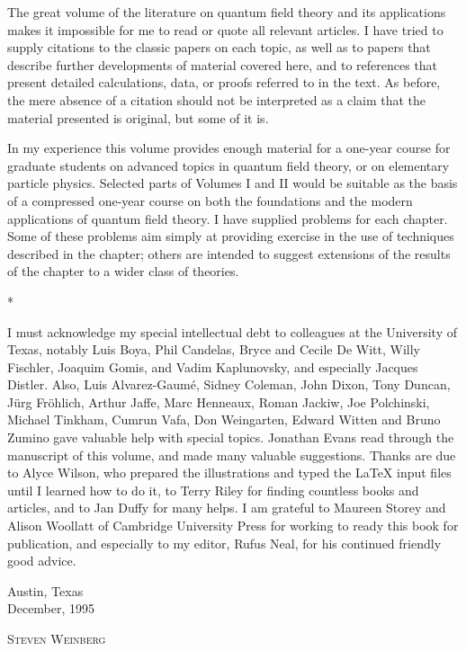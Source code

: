 The great volume of the literature on quantum field theory and its applications
makes it impossible for me to read or quote all relevant articles. I have tried
to supply citations to the classic papers on each topic, as well as to papers
that describe further developments of material covered here, and to references
that present detailed calculations, data, or proofs referred to in the text. As
before, the mere absence of a citation should not be interpreted as a claim that
the material presented is original, but some of it is.

In my experience this volume provides enough material for a one-year course for
graduate students on advanced topics in quantum field theory, or on elementary
particle physics. Selected parts of Volumes I and II would be suitable as the
basis of a compressed one-year course on both the foundations and the modern
applications of quantum field theory. I have supplied problems for each
chapter. Some of these problems aim simply at providing exercise in the use of
techniques described in the chapter; others are intended to suggest extensions
of the results of the chapter to a wider class of theories.

\begin{center}
  *\quad*\quad*
\end{center}

I must acknowledge my special intellectual debt to colleagues at the University
of Texas, notably Luis Boya, Phil Candelas, Bryce and Cecile De Witt, Willy
Fischler, Joaquim Gomis, and Vadim Kaplunovsky, and especially Jacques Distler.
Also, Luis Alvarez-Gaum\'e, Sidney Coleman, John Dixon, Tony Duncan, J\"urg
Fr\"ohlich, Arthur Jaffe, Marc Henneaux, Roman Jackiw, Joe Polchinski, Michael
Tinkham, Cumrun Vafa, Don Weingarten, Edward Witten and Bruno Zumino gave
valuable help with special topics. Jonathan Evans read through the manuscript
of this volume, and made many valuable suggestions. Thanks are due to Alyce
Wilson, who prepared the illustrations and typed the \LaTeX{} input files until
I learned how to do it, to Terry Riley for finding countless books and
articles, and to Jan Duffy for many helps. I am grateful to Maureen Storey and
Alison Woollatt of Cambridge University Press for working to ready this book for
publication, and especially to my editor, Rufus Neal, for his continued friendly
good advice.

\vspace{2.5em}
\noindent
\begin{minipage}[t]{0.45\textwidth}
Austin, Texas\\
December, 1995
\end{minipage}
\hfill
\begin{minipage}[t]{0.45\textwidth}
\raggedleft
\textsc{Steven Weinberg}
\end{minipage}
